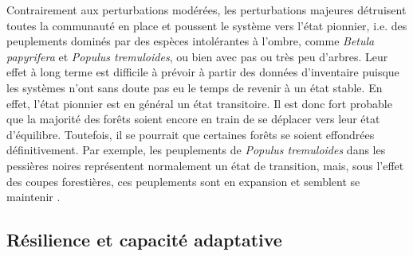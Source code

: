 Contrairement aux perturbations modérées, les perturbations majeures
détruisent toutes la communauté en place et poussent le système vers
l'état pionnier, i.e. des peuplements dominés par des espèces
intolérantes à l'ombre, comme \emph{Betula papyrifera} et \emph{Populus
tremuloides}, ou bien avec pas ou très peu d'arbres. Leur effet à long
terme est difficile à prévoir à partir des données d'inventaire puisque
les systèmes n'ont sans doute pas eu le temps de revenir à un état
stable. En effet, l'état pionnier est en général un état transitoire. Il
est donc fort probable que la majorité des forêts soient encore en train
de se déplacer vers leur état d'équilibre. Toutefois, il se pourrait que
certaines forêts se soient effondrées définitivement. Par exemple, les
peuplements de \emph{Populus tremuloides} dans les pessières noires
représentent normalement un état de transition, mais, sous l'effet des
coupes forestières, ces peuplements sont en expansion et semblent se
maintenir \citep{grondin_les_2003}.

\hypertarget{ruxe9silience-et-capacituxe9-adaptative}{%
\subsection{Résilience et capacité
adaptative}\label{ruxe9silience-et-capacituxe9-adaptative}}

